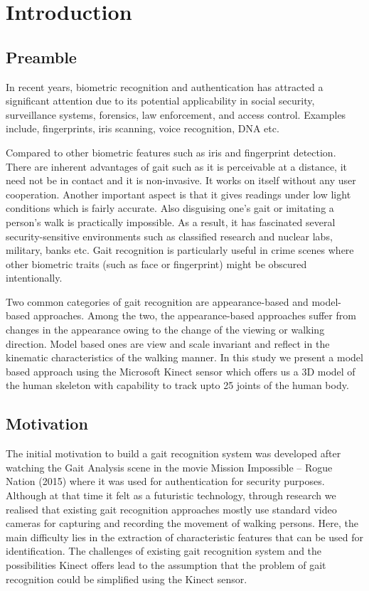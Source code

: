 \chapter{Introduction} \label{Introduction}

\section{Preamble} \label{Preamble}
\noindent In recent years, biometric recognition and authentication has attracted a significant attention due to its potential applicability in social security, surveillance systems, forensics, law enforcement, and access control. Examples include, fingerprints, iris scanning, voice recognition, DNA etc. 

\noindent Compared to other biometric features such as iris and fingerprint detection. There are inherent advantages of gait such as it is perceivable at a distance, it need not be in contact and it is non-invasive. It works on itself without any user cooperation. Another important aspect is that it gives readings under low light conditions which is fairly accurate. Also disguising one’s gait or imitating a person’s walk is practically impossible. As a result, it has fascinated several security-sensitive environments such as classified research and nuclear labs, military, banks etc. Gait recognition is particularly useful in crime scenes where other biometric traits (such as face or fingerprint) might be obscured intentionally. 

\noindent Two common categories of gait recognition are appearance-based and model-based approaches. Among the two, the appearance-based approaches suffer from changes in the appearance owing to the change of the viewing or walking direction. Model based ones are view and scale invariant and reflect in the kinematic characteristics of the walking manner. In this study we present a model based approach using the Microsoft Kinect sensor which offers us a 3D model of the human skeleton with capability to track upto 25 joints of the human body.
\newpage 
\section{Motivation}\label{Motivation}
\noindent The initial motivation to build a gait recognition system was developed after watching the Gait Analysis scene in the movie Mission Impossible – Rogue Nation (2015) where it was used for authentication for security purposes. Although at that time it felt as a futuristic technology, through research we realised that existing gait recognition approaches mostly use standard video cameras for capturing and recording the movement of walking persons. Here, the main difficulty lies in the extraction of characteristic features that can be used for identification. The challenges of existing gait recognition system and the possibilities Kinect offers lead to the assumption that the problem of gait recognition could be simplified using the Kinect sensor.
\newpage

